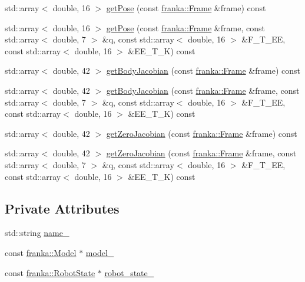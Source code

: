 \begin{DoxyCompactItemize}
\item 
std\+::array$<$ double, 16 $>$ \hyperlink{classfranka__hw_1_1FrankaModelHandle_af6617a4a3a89908c4a0aa8d25b2bfc07}{get\+Pose} (const \hyperlink{namespacefranka_a00b729ddce916481d3f0d10febec4f5b}{franka\+::\+Frame} \&frame) const
\item 
std\+::array$<$ double, 16 $>$ \hyperlink{classfranka__hw_1_1FrankaModelHandle_aa5f4161223cf728ad3ca1bf48768df50}{get\+Pose} (const \hyperlink{namespacefranka_a00b729ddce916481d3f0d10febec4f5b}{franka\+::\+Frame} \&frame, const std\+::array$<$ double, 7 $>$ \&q, const std\+::array$<$ double, 16 $>$ \&F\+\_\+\+T\+\_\+\+EE, const std\+::array$<$ double, 16 $>$ \&E\+E\+\_\+\+T\+\_\+K) const
\item 
std\+::array$<$ double, 42 $>$ \hyperlink{classfranka__hw_1_1FrankaModelHandle_adc7a47e0c49ab6c15be950f3a41df8c8}{get\+Body\+Jacobian} (const \hyperlink{namespacefranka_a00b729ddce916481d3f0d10febec4f5b}{franka\+::\+Frame} \&frame) const
\item 
std\+::array$<$ double, 42 $>$ \hyperlink{classfranka__hw_1_1FrankaModelHandle_a1b5ba63881c0dc365590c6e116576704}{get\+Body\+Jacobian} (const \hyperlink{namespacefranka_a00b729ddce916481d3f0d10febec4f5b}{franka\+::\+Frame} \&frame, const std\+::array$<$ double, 7 $>$ \&q, const std\+::array$<$ double, 16 $>$ \&F\+\_\+\+T\+\_\+\+EE, const std\+::array$<$ double, 16 $>$ \&E\+E\+\_\+\+T\+\_\+K) const
\item 
std\+::array$<$ double, 42 $>$ \hyperlink{classfranka__hw_1_1FrankaModelHandle_a09d1582af0e1a0e8dd156f612c06b7f6}{get\+Zero\+Jacobian} (const \hyperlink{namespacefranka_a00b729ddce916481d3f0d10febec4f5b}{franka\+::\+Frame} \&frame) const
\item 
std\+::array$<$ double, 42 $>$ \hyperlink{classfranka__hw_1_1FrankaModelHandle_a5ce6ac6116ac3c45c923e5c2d515616c}{get\+Zero\+Jacobian} (const \hyperlink{namespacefranka_a00b729ddce916481d3f0d10febec4f5b}{franka\+::\+Frame} \&frame, const std\+::array$<$ double, 7 $>$ \&q, const std\+::array$<$ double, 16 $>$ \&F\+\_\+\+T\+\_\+\+EE, const std\+::array$<$ double, 16 $>$ \&E\+E\+\_\+\+T\+\_\+K) const
\end{DoxyCompactItemize}
\subsection*{Private Attributes}
\begin{DoxyCompactItemize}
\item 
std\+::string \hyperlink{classfranka__hw_1_1FrankaModelHandle_ab2e979b4a0e4ca3d68488f2d0432c066}{name\+\_\+}
\item 
const \hyperlink{classfranka_1_1Model}{franka\+::\+Model} $\ast$ \hyperlink{classfranka__hw_1_1FrankaModelHandle_a0c47e6c735f1bd809581b0498d53349b}{model\+\_\+}
\item 
const \hyperlink{structfranka_1_1RobotState}{franka\+::\+Robot\+State} $\ast$ \hyperlink{classfranka__hw_1_1FrankaModelHandle_a16192f263ce4709d99f557c6d8fabeb1}{robot\+\_\+state\+\_\+}
\end{DoxyCompactItemize}


